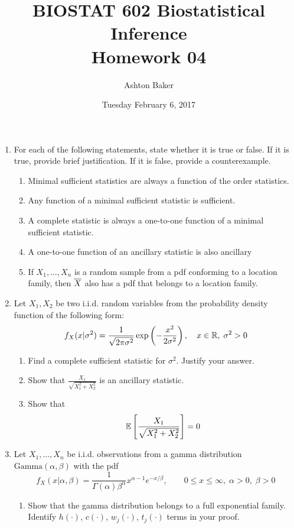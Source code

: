 \documentclass[titlepage]{article}
\begin{document}
\title{BIOSTAT 602 Biostatistical Inference\\Homework 04}
\author{Ashton Baker}
\date{Tuesday February 6, 2017}
\maketitle
\begin{enumerate}
\item For each of the following statements, state whether it is true or false.
  If it is true, provide brief justification. If it is false, provide a counterexample.

  \begin{enumerate}
    \item Minimal sufficient statistics are always a function of the order statistics.

    \item Any function of a minimal sufficient statistic is sufficient.

    \item A complete statistic is always a one-to-one function of a minimal sufficient statistic.

    \item A one-to-one function of an ancillary statistic is also ancillary

    \item If $X_1, \ldots, X_n$ is a random sample from a pdf conforming to a location family, then $\overline{X}$ also has a pdf that belongs to a location family.
  \end{enumerate}

\item Let $X_1, X_2$ be two i.i.d. random variables from the probability density
  function of the following form:
  \[f_X(x|\sigma^2) = \frac{1}{\sqrt{2\pi\sigma^2}}\exp\left(-\frac{x^2}{2\sigma^2} \right), \quad x \in \mathbb{R}, \; \sigma^2 > 0\]

  \begin{enumerate}
    \item Find a complete sufficient statistic for $\sigma^2$. Justify your answer.

    \item Show that $\frac{X_1}{\sqrt{X_1^2 + X_2^2}}$ is an ancillary statistic.

    \item Show that
    \[\mathbb{E}\left[ \frac{X_1}{\sqrt{X_1^2 + X_2^2}} \right] = 0\]
  \end{enumerate}

\item Let $X_1, \ldots, X_n$ be i.i.d. observations from a gamma distribution $\text{Gamma}(\alpha, \beta)$ with the pdf
\[f_X(x|\alpha, \beta) = \frac{1}{\Gamma(\alpha)\beta^\alpha}x^{\alpha - 1}e^{-x/\beta}, \qquad 0 \leq x \leq \infty, \; \alpha > 0, \; \beta > 0\]
  \begin{enumerate}
    \item Show that the gamma distribution belongs to a full exponential family. Identify $h(\cdot)$, $c(\cdot)$, $w_j(\cdot)$, $t_j(\cdot)$ terms in your proof.


\end{enumerate}
\end{enumerate}
\end{document}
